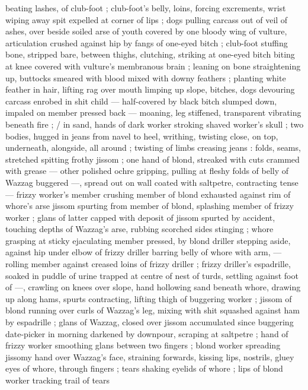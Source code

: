 beating lashes, of club-foot ; club-foot’s belly, loins, forcing
excrements, wrist wiping away spit expelled at corner of lips ; dogs
pulling carcass out of veil of ashes, over beside soiled arse of youth
covered by one bloody wing of vulture, articulation crushed against
hip by fangs of one-eyed bitch ; club-foot stuffing bone, stripped
bare, between thighs, clutching, striking at one-eyed bitch biting at
knee covered with vulture’s membranous brain ; leaning on bone
straightening up, buttocks smeared with blood mixed with downy
feathers ; planting white feather in hair, lifting rag over mouth
limping up slope, bitches, dogs devouring carcass enrobed in shit
child --- half-covered by black bitch slumped down, impaled on
member pressed back --- moaning, leg stiffened, transparent
vibrating beneath fire ; / in sand, hands of dark worker stroking
shaved worker's skull ; two bodies, hugged in jeans from navel to
heel, writhing, twisting close, on top, underneath, alongside, all
around ; twisting of limbs creasing jeans : folds, seams, stretched
spitting frothy jissom ; one hand of blond, streaked with cuts
crammed with grease --- other polished ochre gripping, pulling at
fleshy folds of belly of Wazzag buggered ---, spread out on wall
coated with saltpetre, contracting tense --- frizzy worker's member
crushing member of blond exhausted against rim of whore’s arse
jissom spurting from member of blond, splashing member of frizzy
worker ; glans of latter capped with deposit of jissom spurted by
accident, touching depths of Wazzag's arse, rubbing scorched sides
stinging ; whore grasping at sticky ejaculating member pressed, by
blond driller stepping aside, against hip under elbow of frizzy driller
barring belly of whore with arm, --- rolling member against creased
loins of frizzy driller ; frizzy driller's espadrille, soaked in puddle of
urine trapped at centre of nest of turds, settling against foot of
---, crawling on knees over slope, hand hollowing sand beneath
whore, drawing up along hams, spurts contracting, lifting thigh of
buggering worker ; jissom of blond running over curls of Wazzag's
leg, mixing with shit squashed against ham by espadrille ; glans of
Wazzag, closed over jissom accumulated since buggering date-picker
in morning darkened by downpour, scraping at saltpetre ; hand of
frizzy worker smoothing glans between two fingers ; blond worker
spreading jissomy hand over Wazzag's face, straining forwards,
kissing lips, nostrils, gluey eyes of whore, through fingers ; tears
shaking eyelids of whore ; lips of blond worker tracking trail of tears
